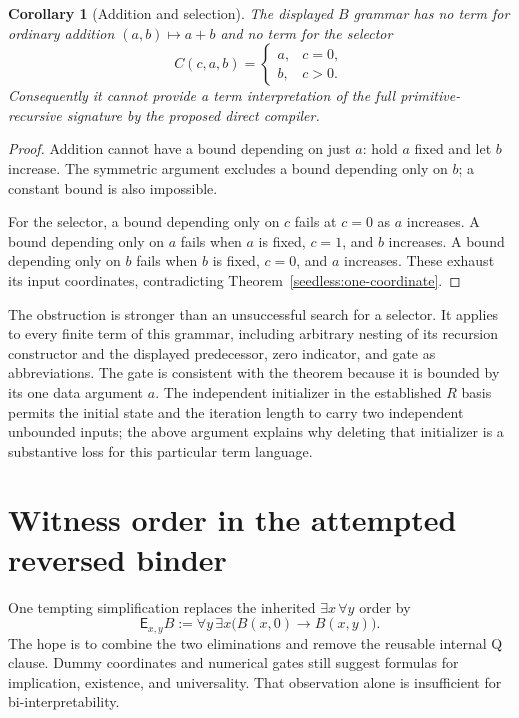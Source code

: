 \documentclass[11pt,letterpaper]{article}
\newtheorem{corollary}[theorem]{Corollary}
\theoremstyle{definition}\newtheorem{definition}[theorem]{Definition}
\theoremstyle{remark}\newtheorem{remark}[theorem]{Remark}
\begin{document}
\begin{corollary}[Addition and selection]
\label{seedless:no-selector}
The displayed $B$ grammar has no term for ordinary addition
$(a,b)\mapsto a+b$ and no term for the selector
\[
 C(c,a,b)=
 \begin{cases}
 a,&c=0,\\
 b,&c>0.
 \end{cases}
\]
Consequently it cannot provide a term interpretation of the full
primitive-recursive signature by the proposed direct compiler.
\end{corollary}
\begin{proof}
Addition cannot have a bound depending on just $a$: hold $a$ fixed and
let $b$ increase. The symmetric argument excludes a bound depending
only on $b$; a constant bound is also impossible.

For the selector, a bound depending only on $c$ fails at $c=0$ as $a$
increases. A bound depending only on $a$ fails when $a$ is fixed,
$c=1$, and $b$ increases. A bound depending only on $b$ fails when
$b$ is fixed, $c=0$, and $a$ increases. These exhaust its input
coordinates, contradicting Theorem~\ref{seedless:one-coordinate}.
\end{proof}

The obstruction is stronger than an unsuccessful search for a selector.
It applies to every finite term of this grammar, including arbitrary
nesting of its recursion constructor and the displayed predecessor,
zero indicator, and gate as abbreviations. The gate is consistent with
the theorem because it is bounded by its one data argument $a$.
The independent initializer in the established $R$ basis permits the
initial state and the iteration length to carry two independent
unbounded inputs; the above argument explains why deleting that
initializer is a substantive loss for this particular term language.


\section{Witness order in the attempted reversed binder}
\label{sec:reversed}

One tempting simplification replaces the inherited
$\exists x\,\forall y$ order by
\[
 \mathsf E_{x,y}B
       :=\forall y\,\exists x\bigl(B(x,0)\to B(x,y)\bigr).
\]
The hope is to combine the two eliminations and remove the reusable
internal Q clause. Dummy coordinates and numerical gates still suggest
formulas for implication, existence, and universality. That observation
alone is insufficient for bi-interpretability.
\end{document}
